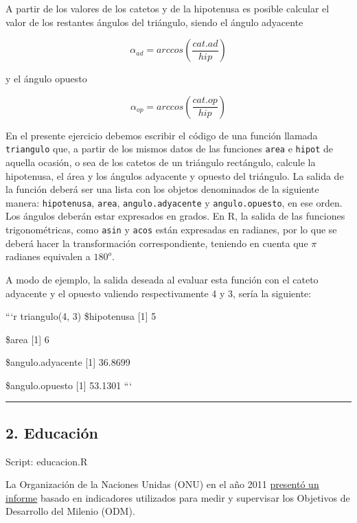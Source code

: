 \documentclass{article}
\begin{document}
A partir de los valores de los catetos y de la hipotenusa es posible
calcular el valor de los restantes ángulos del triángulo, siendo el
ángulo adyacente

\[
\alpha_{ad} = arccos \left( \frac{cat.ad}{hip} \right)
\]

y el ángulo opuesto

\[
\alpha_{op} = arccos \left( \frac{cat.op}{hip} \right)
\]

En el presente ejercicio debemos escribir el código de una función
llamada \verb!triangulo! que, a partir de los mismos datos de las
funciones \verb!area! e \verb!hipot! de aquella ocasión, o sea de los
catetos de un triángulo rectángulo, calcule la hipotenusa, el área y los
ángulos adyacente y opuesto del triángulo. La salida de la función
deberá ser una lista con los objetos denominados de la siguiente manera:
\verb!hipotenusa!, \verb!area!, \verb!angulo.adyacente! y
\verb!angulo.opuesto!, en ese orden. Los ángulos deberán estar
expresados en grados. En R, la salida de las funciones trigonométricas,
como \verb!asin! y \verb!acos! están expresadas en radianes, por lo que
se deberá hacer la transformación correspondiente, teniendo en cuenta
que $\pi$ radianes equivalen a $180^o$.

A modo de ejemplo, la salida deseada al evaluar esta función con el
cateto adyacente y el opuesto valiendo respectivamente 4 y 3, sería la
siguiente:

```r triangulo(4, 3) \$hipotenusa {[}1{]} 5

\$area {[}1{]} 6

\$angulo.adyacente {[}1{]} 36.8699

\$angulo.opuesto {[}1{]} 53.1301 ```

\begin{center}\rule{3in}{0.4pt}\end{center}

\subsection{2. Educación}

Script: educacion.R

La Organización de la Naciones Unidas (ONU) en el año 2011
\href{http://mdgs.un.org/unsd/mdg/Resources/Static/Products/Progress2011/11-31342\%20\%28S\%29\%20MDG\%20Report\%202011\_Book\%20LR.pdf}{presentó
un informe} basado en indicadores utilizados para medir y supervisar los
Objetivos de Desarrollo del Milenio (ODM).
\end{document}
